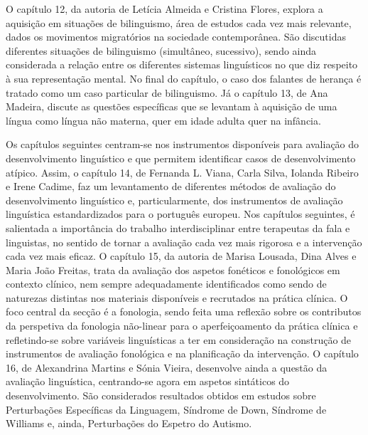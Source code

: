 \begin{refsection}
O capítulo 12, da autoria de Letícia Almeida e Cristina Flores, explora a aquisição em situações de bilinguismo, área de estudos cada vez mais relevante, dados os movimentos migratórios na sociedade contemporânea. São discutidas diferentes situações de bilinguismo (simultâneo, sucessivo), sendo ainda considerada a relação entre os diferentes sistemas linguísticos no que diz respeito à sua representação mental. No final do capítulo, o caso dos falantes de herança é tratado como um caso particular de bilinguismo. Já o capítulo 13, de Ana Madeira, discute as questões específicas que se levantam à aquisição de uma língua como língua não materna, quer em idade adulta quer na infância. 

Os capítulos seguintes centram-se nos instrumentos disponíveis para avaliação do desenvolvimento linguístico e que permitem identificar casos de desenvolvimento atípico. Assim, o capítulo 14, de Fernanda L. Viana, Carla Silva, Iolanda Ribeiro e Irene Cadime, faz um levantamento de diferentes métodos de avaliação do desenvolvimento linguístico e, particularmente, dos instrumentos de avaliação linguística estandardizados para o português europeu. Nos capítulos seguintes, é salientada a importância do trabalho interdisciplinar entre terapeutas da fala e linguistas, no sentido de tornar a avaliação cada vez mais rigorosa e a intervenção cada vez mais eficaz. O capítulo 15, da autoria de Marisa Lousada, Dina Alves e Maria João Freitas, trata da avaliação dos aspetos fonéticos e fonológicos em contexto clínico, nem sempre adequadamente identificados como sendo de naturezas distintas nos materiais disponíveis e recrutados na prática clínica. O foco central da secção é a fonologia, sendo feita uma reflexão sobre os contributos da perspetiva da fonologia não-linear para o aperfeiçoamento da prática clínica e refletindo-se sobre variáveis linguísticas a ter em consideração na construção de instrumentos de avaliação fonológica e na planificação da intervenção. O capítulo 16, de Alexandrina Martins e Sónia Vieira, desenvolve ainda a questão da avaliação linguística, centrando-se agora em aspetos sintáticos do desenvolvimento. São considerados resultados obtidos em estudos sobre Perturbações Específicas da Linguagem, Síndrome de Down, Síndrome de Williams e, ainda, Perturbações do Espetro do Autismo. 


\end{refsection}
